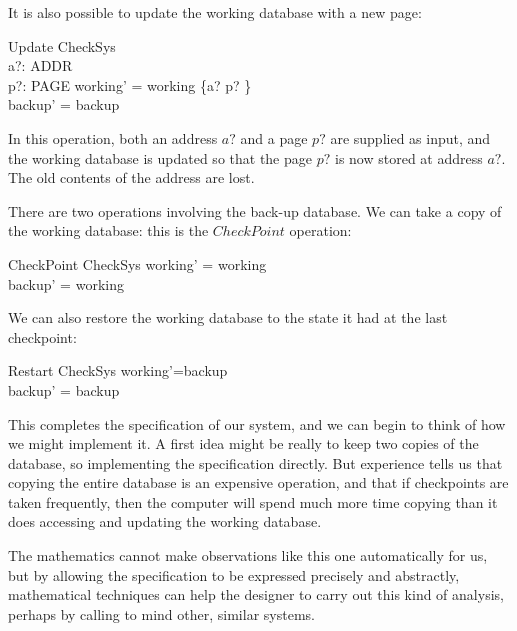 \documentclass[12pt]{article}
\begin{document}
It is also possible to update the working database with a new page:
\begin{schema}{Update}
	\Delta CheckSys \\
	a?: ADDR \\
	p?: PAGE
\where
	working' = working \oplus \{a? \mapsto p? \} \\
	backup' = backup
\end{schema}
In this operation, both an address $a?$ and a page $p?$ are supplied as
input, and the working database is updated so that the page $p?$ is now
stored at address $a?$.  The old contents of the address are lost.

There are two operations involving the back-up
database. We can take a copy of the working database: this
is the $CheckPoint$ operation: 
\begin{schema}{CheckPoint}
	\Delta CheckSys
\where
	working' = working \\
	backup' = working
\end{schema}
We can also restore the working database to the state it had
at the last checkpoint:
\begin{schema}{Restart}
	\Delta CheckSys
\where 
	working'=backup \\
	backup' = backup
\end{schema}
This completes the specification of our system, and we can begin to
think of how we might implement it.
A first idea might be really to keep two copies of the database, so
implementing the specification directly.
But experience tells us that copying the entire database is an expensive
operation, and that if checkpoints are taken frequently, then the computer
will spend much more time copying than it does accessing and updating
the working database.

The mathematics cannot make observations like this one
automatically for us, but by allowing the
specification to be expressed precisely and abstractly,
mathematical techniques can help the designer to carry out
this kind of analysis, perhaps by calling to mind other, similar systems.
\end{document}
